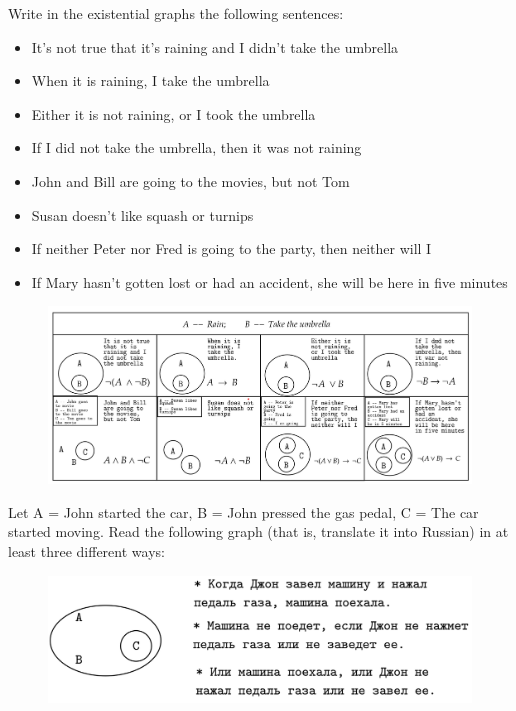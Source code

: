 \documentclass[12pt]{report}
\begin{document}
\boldmath
{}
    \begin{problem}{}
        Write in the existential graphs the following sentences:
        \begin{itemize}
            \item It's not true that it's raining and I didn't take the umbrella
            \item When it is raining, I take the umbrella
            \item Either it is not raining, or I took the umbrella
            \item If I did not take the umbrella, then it was not raining
            \item John and Bill are going to the movies, but not Tom 
            \item Susan doesn’t like squash or turnips
            \item If neither Peter nor Fred is going to the party, then neither will I
            \item If Mary hasn’t gotten lost or had an accident, she will be here in five minutes
        \end{itemize}
    \end{problem}
        \begin{figure}[H]
            \center
            \includegraphics[scale=0.6]{p1.png}
        \end{figure}
    \begin{problem}{}
        Let A = John started the car, B = John pressed the gas pedal, C = The car started moving. 
        Read the following graph (that is, translate it into Russian) in at least three different ways:
    \end{problem}
    \begin{figure}[H]
        \center
        \includegraphics[scale=0.4]{p2.png}
    \end{figure}
\end{document}
